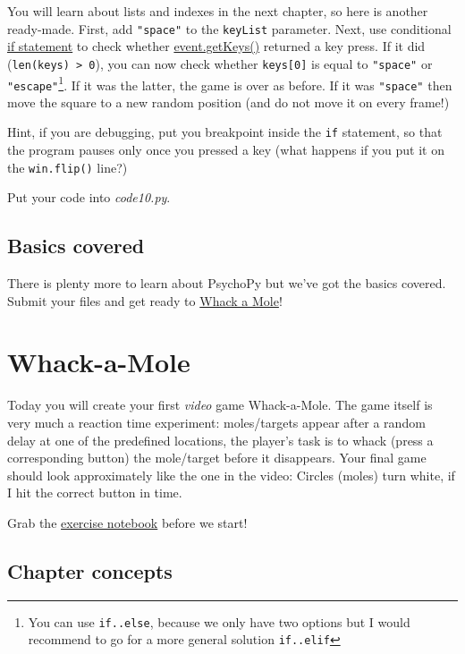 \documentclass[
]{book}
\begin{document}
You will learn about lists and indexes in the next chapter, so here is another ready-made. First, add \texttt{"space"} to the \texttt{keyList} parameter. Next, use conditional \protect\hyperlink{ux5cux257Bux5cux23if-statement}{if statement} to check whether \href{https://psychopy.org/api/event.html\#psychopy.event.getKeys}{event.getKeys()} returned a key press. If it did (\texttt{len(keys)\ \textgreater{}\ 0}), you can now check whether \texttt{keys{[}0{]}} is equal to \texttt{"space"} or \texttt{"escape"}\footnote{You can use \texttt{if..else}, because we only have two options but I would recommend to go for a more general solution \texttt{if..elif}}. If it was the latter, the game is over as before. If it was \texttt{"space"} then move the square to a new random position (and do not move it on every frame!)

Hint, if you are debugging, put you breakpoint inside the \texttt{if} statement, so that the program pauses only once you pressed a key (what happens if you put it on the \texttt{win.flip()} line?)

Put your code into \emph{code10.py}.

\hypertarget{basics-covered}{%
\section{Basics covered}\label{basics-covered}}

There is plenty more to learn about PsychoPy but we've got the basics covered. Submit your files and get ready to \protect\hyperlink{whack-a-mole}{Whack a Mole}!

\hypertarget{whack-a-mole}{%
\chapter{Whack-a-Mole}\label{whack-a-mole}}

Today you will create your first \emph{video} game Whack-a-Mole. The game itself is very much a reaction time experiment: moles/targets appear after a random delay at one of the predefined locations, the player's task is to whack (press a corresponding button) the mole/target before it disappears. Your final game should look approximately like the one in the video: Circles (moles) turn white, if I hit the correct button in time.

Grab the \href{notebooks/07.\%20Whack-a-mole.ipynb}{exercise notebook} before we start!

\hypertarget{chapter-concepts-4}{%
\section{Chapter concepts}\label{chapter-concepts-4}}
\end{document}
